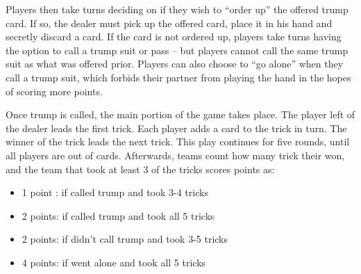 Players then take turns deciding on if they wish to ``order up'' the offered trump card. If so, the dealer must pick up the offered card,
place it in his hand and secretly discard a card. If the card is not ordered up, players take turns having the option to call a trump suit
or pass -- but players cannot call the same trump suit as what was offered prior. Players can also choose to ``go alone'' when they call
a trump suit, which forbids their partner from playing the hand in the hopes of scoring more points.

Once trump is called, the main portion of the game takes place. The player left of the dealer leads the first trick. Each player adds a card
to the trick in turn. The winner of the trick leads the next trick. This play continues for five rounds, until all players are out of cards.
Afterwards, teams count how many trick their won, and the team that took at least 3 of the tricks scores points as:
\begin{itemize}[noitemsep, label={}]
    \item 1 point : if called trump and took 3-4 tricks
    \item 2 points: if called trump and took all 5 tricks
    \item 2 points: if didn't call trump and took 3-5 tricks
    \item 4 points: if went alone and took all 5 tricks
\end{itemize}

